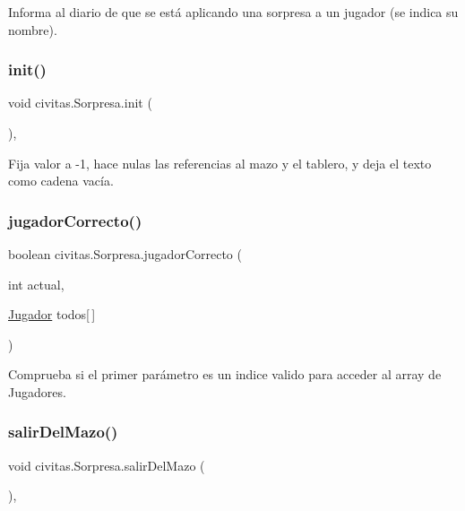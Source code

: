 Informa al diario de que se está aplicando una sorpresa a un jugador (se indica su nombre). \mbox{\label{classcivitas_1_1Sorpresa_a84bd6659e667747df646da45a3467cd5}} 
\subsubsection{\texorpdfstring{init()}{init()}}
{\footnotesize\ttfamily void civitas.\+Sorpresa.\+init (\begin{DoxyParamCaption}{ }\end{DoxyParamCaption})\hspace{0.3cm}{\ttfamily [inline]}, {\ttfamily [private]}}

Fija valor a -\/1, hace nulas las referencias al mazo y el tablero, y deja el texto como cadena vacía. \mbox{\label{classcivitas_1_1Sorpresa_a640887e96c19efefffbd92b97f710381}} 
\subsubsection{\texorpdfstring{jugador\+Correcto()}{jugadorCorrecto()}}
{\footnotesize\ttfamily boolean civitas.\+Sorpresa.\+jugador\+Correcto (\begin{DoxyParamCaption}\item[{int}]{actual,  }\item[{\hyperlink{classcivitas_1_1Jugador}{Jugador}}]{todos\mbox{[}$\,$\mbox{]} }\end{DoxyParamCaption})\hspace{0.3cm}{\ttfamily [inline]}}

Comprueba si el primer parámetro es un indice valido para acceder al array de Jugadores. \mbox{\label{classcivitas_1_1Sorpresa_a8b9ba892b6e916fde058e62d1a3c1b78}} 
\subsubsection{\texorpdfstring{salir\+Del\+Mazo()}{salirDelMazo()}}
{\footnotesize\ttfamily void civitas.\+Sorpresa.\+salir\+Del\+Mazo (\begin{DoxyParamCaption}{ }\end{DoxyParamCaption})\hspace{0.3cm}{\ttfamily [inline]}, {\ttfamily [package]}}

